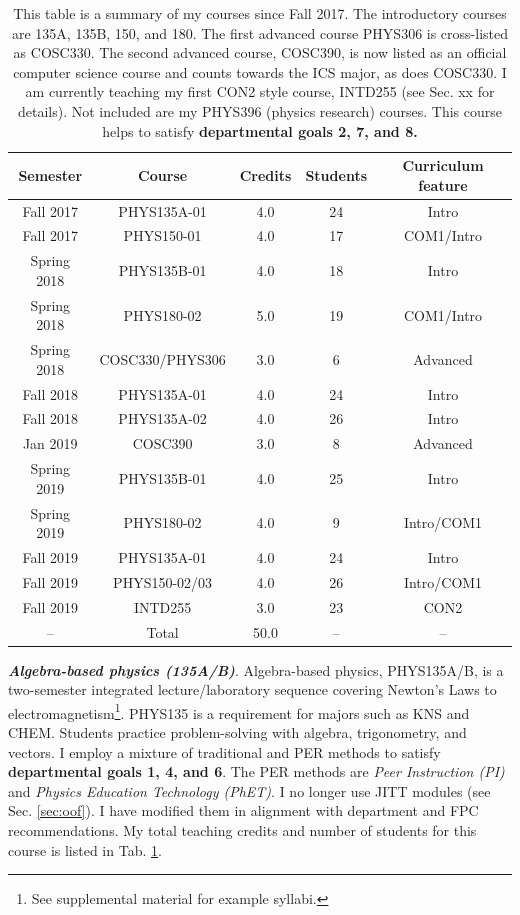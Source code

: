 \documentclass[../../../main.tex]{subfiles}
\begin{document}
\label{sec:courseDesc}

\begin{table}
\centering
\begin{tabular}{| c | c | c | c | c |}
\hline \hline
Semester & Course & Credits & Students & Curriculum feature \\ \hline
Fall 2017 & PHYS135A-01 & 4.0 & 24 & Intro \\ \hline
Fall 2017 & PHYS150-01 & 4.0 & 17 & COM1/Intro \\ \hline
Spring 2018 & PHYS135B-01 & 4.0 & 18 & Intro \\ \hline
Spring 2018 & PHYS180-02 & 5.0 & 19 & COM1/Intro \\ \hline
Spring 2018 & COSC330/PHYS306 & 3.0 & 6 & Advanced \\ \hline
Fall 2018 & PHYS135A-01 & 4.0 & 24 & Intro \\ \hline
Fall 2018 & PHYS135A-02 & 4.0 & 26 & Intro \\ \hline
Jan 2019 & COSC390 & 3.0 & 8 & Advanced \\ \hline
Spring 2019 & PHYS135B-01 & 4.0 & 25 & Intro \\ \hline
Spring 2019 & PHYS180-02 & 4.0 & 9 & Intro/COM1 \\ \hline
Fall 2019 & PHYS135A-01 & 4.0 & 24 & Intro \\ \hline
Fall 2019 & PHYS150-02/03 & 4.0 & 26 & Intro/COM1 \\ \hline
Fall 2019 & INTD255 & 3.0 & 23 & CON2 \\ \hline
-- & Total & 50.0 & -- & -- \\ \hline
\hline
\end{tabular}
\caption{\label{tab:courses:teaching} This table is a summary of my courses since Fall 2017.  The introductory courses are 135A, 135B, 150, and 180.  The first advanced course PHYS306 is cross-listed as COSC330. The second advanced course, COSC390, is now listed as an official computer science course and counts towards the ICS major, as does COSC330.  I am currently teaching my first CON2 style course, INTD255 (see Sec. xx for details). Not included are my PHYS396 (physics research) courses.  This course helps to satisfy \textbf{departmental goals 2, 7, and 8.}}
\end{table}

\textbf{\textit{Algebra-based physics (135A/B)}}. Algebra-based physics, PHYS135A/B, is a two-semester integrated lecture/laboratory sequence covering Newton's Laws to electromagnetism\footnote{See supplemental material for example syllabi.}.  PHYS135 is a requirement for majors such as KNS and CHEM.  Students practice problem-solving with algebra, trigonometry, and vectors.  I employ a mixture of traditional and PER methods to satisfy \textbf{departmental goals 1, 4, and 6}.  The PER methods are \textit{Peer Instruction (PI)} and \textit{Physics Education Technology (PhET)}.  I no longer use JITT modules (see Sec. \ref{sec:oof}).  I have modified them in alignment with department and FPC recommendations.  My total teaching credits and number of students for this course is listed in Tab. \ref{tab:courses:teaching}.  \\ \hspace{0.1cm}
\end{document}
